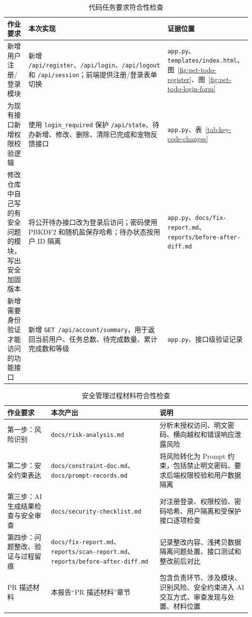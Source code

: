 \documentclass[12pt,a4paper]{ctexart}
\begin{document}
\begin{table}[H]
    \centering
    \caption{代码任务要求符合性检查}
    \label{tab:requirement-check}
    \begin{tabularx}{\textwidth}{L{4.6cm}Y Y}
        \toprule
        作业要求 & 本次实现 & 证据位置 \\
        \midrule
        新增用户注册/登录模块 & 新增 \texttt{/api/register}、\texttt{/api/login}、\texttt{/api/logout} 和 \texttt{/api/session}；前端提供注册/登录表单切换 & \texttt{app.py}、\texttt{templates/index.html}、图~\ref{fig:pet-todo-register}、图~\ref{fig:pet-todo-login-form} \\
        为现有接口新增权限校验逻辑 & 使用 \texttt{login\_required} 保护 \texttt{/api/state}、待办新增、修改、删除、清除已完成和宠物反馈接口 & \texttt{app.py}、表~\ref{tab:key-code-changes} \\
        修改仓库中自己写的有安全问题的模块，写出安全加固版本 & 将公开待办接口改为登录后访问；密码使用 PBKDF2 和随机盐保存哈希；待办状态按用户 ID 隔离 & \texttt{app.py}、\texttt{docs/fix-report.md}、\texttt{reports/before-after-diff.md} \\
        新增需要身份验证才能访问的功能接口 & 新增 \texttt{GET /api/account/summary}，用于返回当前用户、任务总数、待完成数量、累计完成数和等级 & \texttt{app.py}、接口级验证记录 \\
        \bottomrule
    \end{tabularx}
\end{table}

\begin{table}[H]
    \centering
    \caption{安全管理过程材料符合性检查}
    \label{tab:process-check}
    \begin{tabularx}{\textwidth}{L{4.6cm}Y Y}
        \toprule
        作业要求 & 本次产出 & 说明 \\
        \midrule
        第一步：风险识别 & \texttt{docs/risk-analysis.md} & 分析未授权访问、明文密码、横向越权和错误响应泄露风险 \\
        第二步：安全约束表达 & \texttt{docs/constraint-doc.md}、\texttt{docs/prompt-records.md} & 将风险转化为 Prompt 约束，包括禁止明文密码、要求后端权限校验和用户数据隔离 \\
        第三步：AI 生成结果检查与安全审查 & \texttt{docs/security-checklist.md} & 对注册登录、权限校验、密码哈希、用户隔离和受保护接口逐项检查 \\
        第四步：问题整改、验证与过程留痕 & \texttt{docs/fix-report.md}、\texttt{reports/scan-report.md}、\texttt{reports/before-after-diff.md} & 记录整改内容、浅拷贝数据隔离问题处置、接口测试和整改前后对比 \\
        PR 描述材料 & 本报告“PR 描述材料”章节 & 包含负责环节、涉及模块、识别风险、安全约束进入 AI 交互方式、审查发现与处置、材料位置 \\
        \bottomrule
    \end{tabularx}
\end{table}
\end{document}
